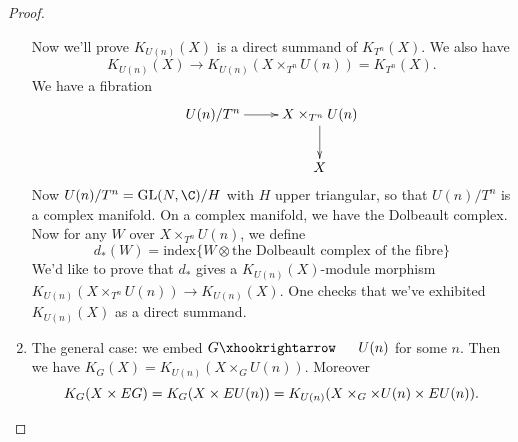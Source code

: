 \documentclass[11pt]{article}
\begin{document}
\begin{GuozhenEqKthyPractice}
\begin{proof}
\begin{enumerate}
Now we'll prove $K_{U(n)}(X)$ is a direct summand of $K_{T^n}(X)$. We also have
\[K_{U(n)}(X)\to K_{U(n)}(X\times_{T^n} U(n))=K_{T^n}(X).\]  
We have a fibration
\[\xymatrix{U(n)/T^n\ar[r]&X\times_{T^n}U(n)\ar[d]\\
&X}\]
Now $U(n)/T^n=\GL(N,\C)/H$ with $H$ upper triangular, so that $U(n)/T^n$ is a complex manifold. On a complex manifold, we have the Dolbeault complex. Now for any $W$ over $X\times_{T^n}U(n)$, we define
\[d_*(W)=\text{index}\{W\otimes\text{the Dolbeault complex of the fibre}\}\]
We'd like to prove that $d_*$ gives a $K_{U(n)}(X)$-module morphism $K_{U(n)}(X\times_{T^n}U(n))\to K_{U(n)}(X)$. One checks that we've exhibited $K_{U(n)}(X)$ as a direct summand.
\item The general case: we embed $G\cofibration U(n)$ for some $n$. Then we have $K_G(X)=K_{U(n)}(X\times_G U(n))$. Moreover
\[K_G(X\times EG)=K_G(X\times EU(n))=K_{U(n)}(X\times_G\times U(n)\times EU(n)).\qedhere\]
\end{enumerate}
\end{proof}

\pagebreak
\end{GuozhenEqKthyPractice}
\end{document}
